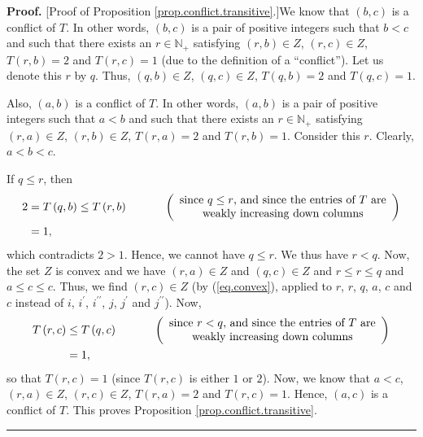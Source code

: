 \documentclass[numbers=enddot,12pt,final,onecolumn,notitlepage]{scrartcl}%
\theoremstyle{definition}
\newenvironment{proof}[1][Proof]{\noindent\textbf{#1.} }{\ \rule{0.5em}{0.5em}}
\newenvironment{verlong}{}{}
\begin{document}
\begin{verlong}
\begin{proof}
[Proof of Proposition \ref{prop.conflict.transitive}.]We know that $\left(
b,c\right)  $ is a conflict of $T$. In other words, $\left(  b,c\right)  $ is
a pair of positive integers such that $b<c$ and such that there exists an
$r\in\mathbb{N}_{+}$ satisfying $\left(  r,b\right)  \in Z$, $\left(
r,c\right)  \in Z$, $T\left(  r,b\right)  =2$ and $T\left(  r,c\right)  =1$
(due to the definition of a \textquotedblleft conflict\textquotedblright). Let
us denote this $r$ by $q$. Thus, $\left(  q,b\right)  \in Z$, $\left(
q,c\right)  \in Z$, $T\left(  q,b\right)  =2$ and $T\left(  q,c\right)  =1$.

Also, $\left(  a,b\right)  $ is a conflict of $T$. In other words, $\left(
a,b\right)  $ is a pair of positive integers such that $a<b$ and such that
there exists an $r\in\mathbb{N}_{+}$ satisfying $\left(  r,a\right)  \in Z$,
$\left(  r,b\right)  \in Z$, $T\left(  r,a\right)  =2$ and $T\left(
r,b\right)  =1$. Consider this $r$. Clearly, $a<b<c$.

If $q\leq r$, then
\begin{align*}
2  &  =T\left(  q,b\right)  \leq T\left(  r,b\right)
\ \ \ \ \ \ \ \ \ \ \left(
\begin{array}
[c]{c}%
\text{since }q\leq r\text{, and since the entries of }T\text{ are}\\
\text{weakly increasing down columns}%
\end{array}
\right) \\
&  =1,
\end{align*}
which contradicts $2>1$. Hence, we cannot have $q\leq r$. We thus have $r<q$.
Now, the set $Z$ is convex and we have $\left(  r,a\right)  \in Z$ and
$\left(  q,c\right)  \in Z$ and $r\leq r\leq q$ and $a\leq c\leq c$. Thus, we
find $\left(  r,c\right)  \in Z$ (by (\ref{eq.convex}), applied to $r$, $r$,
$q$, $a$, $c$ and $c$ instead of $i$, $i^{\prime}$, $i^{\prime\prime}$, $j$,
$j^{\prime}$ and $j^{\prime\prime}$). Now,%
\begin{align*}
T\left(  r,c\right)   &  \leq T\left(  q,c\right)  \ \ \ \ \ \ \ \ \ \ \left(
%
\begin{array}
[c]{c}%
\text{since }r<q\text{, and since the entries of }T\text{ are}\\
\text{weakly increasing down columns}%
\end{array}
\right) \\
&  =1,
\end{align*}
so that $T\left(  r,c\right)  =1$ (since $T\left(  r,c\right)  $ is either $1$
or $2$). Now, we know that $a<c$, $\left(  r,a\right)  \in Z$, $\left(
r,c\right)  \in Z$, $T\left(  r,a\right)  =2$ and $T\left(  r,c\right)  =1$.
Hence, $\left(  a,c\right)  $ is a conflict of $T$. This proves Proposition
\ref{prop.conflict.transitive}.
\end{proof}
\end{verlong}
\end{document}
